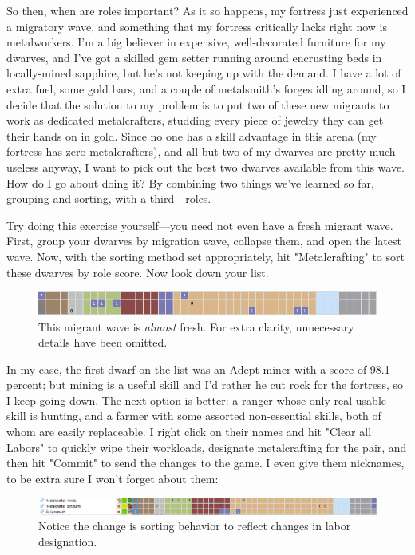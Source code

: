 \documentclass[]{article}
\begin{document}
So then, when are roles important? As it so happens, my fortress just experienced a migratory wave, and
something that my fortress critically lacks right now is metalworkers. I'm a big believer in expensive,
well-decorated furniture for my dwarves, and I've got a skilled gem setter running around encrusting beds
in locally-mined sapphire, but he's not keeping up with the demand. I have a lot of extra fuel, some gold
bars, and a couple of metalsmith's forges idling around, so I decide that the solution to my problem is
to put two of these new migrants to work as dedicated metalcrafters, studding every piece of jewelry they
can get their hands on in gold. Since no one has a skill advantage in this arena (my fortress has zero
metalcrafters), and all but two of my dwarves are pretty much useless anyway, I want to pick out the best
two dwarves available from this wave. How do I go about doing it? By combining two things we've learned
so far, grouping and sorting, with a third---roles.

Try doing this exercise yourself---you need not even have a fresh migrant wave. First, group your dwarves
by migration wave, collapse them, and open the latest wave. Now, with the sorting method set
appropriately, hit "Metalcrafting" to sort these dwarves by role score. Now look down your list.

\begin{figure}[h!]
\centering
\vspace{-5pt}
\includegraphics[width=\linewidth]{Sec3Fig5}
\vspace{-15pt}
\caption{This migrant wave is \emph{almost} fresh. For extra clarity, unnecessary details have been 
omitted.}
\vspace{-5pt}
\end{figure}
In my case, the first dwarf on the list was an Adept miner with a score of 98.1 percent; but mining is a
useful skill and I'd rather he cut rock for the fortress, so I keep going down. The next option is
better: a ranger whose only real usable skill is hunting, and a farmer with some assorted non-essential
skills, both of whom are easily replaceable. I right click on their names and hit "Clear all Labors" to
quickly wipe their workloads, designate metalcrafting for the pair, and then hit "Commit" to send the
changes to the game. I even give them nicknames, to be extra sure I won't forget about them:
\begin{figure}[h!]
\centering
\vspace{-5pt}
\includegraphics[width=\linewidth]{Sec3Fig6}
\vspace{-15pt}
\caption{Notice the change is sorting behavior to reflect changes in labor designation.}
\vspace{-5pt}
\end{figure}
\end{document}
